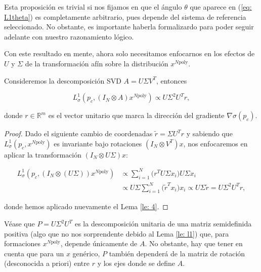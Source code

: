 \newpage

Esta proposición es trivial si nos fijamos en que el ángulo $\theta$ que aparece en (\ref{eq: L1theta}) es completamente arbitrario, pues depende del sistema de referencia seleccionado. No obstante, es importante haberla formalizardo para poder seguir adelante con nuestro razonamiento lógico.

Con este resultado en mente, ahora solo necesitamos enfocarnos en los efectos de $U$ y $\Sigma$ de la transformación afín sobre la distribución $x^{N\text{poly}}$.

\vspace{0.2cm}

\begin{prop} \label{pro: usu}
Consideremos la descomposición SVD $A = U\Sigma V^T$, entonces

\begin{equation}
L^1_\sigma(p_c,(I_N \otimes A) x^{N\text{poly}}) \propto U\Sigma^2U^Tr, \nonumber
\end{equation}

donde $r\in\mathbb{R}^m$ es el vector unitario que marca la dirección del gradiente $\nabla\sigma(p_c)$.
\end{prop}
\begin{proof}
Dado el siguiente cambio de coordenadas $\tilde r = \Sigma U^Tr$ y sabiendo que $L^1_\sigma(p_c, x^{N\text{poly}})$ es invariante bajo rotaciones $(I_N\otimes V^T)x$, nos enfocaremos en aplicar la transformación $(I_N \otimes U\Sigma) x$:

\begin{align}
L^1_\sigma(p_c,(I_N \otimes (U\Sigma)) x^{N\text{poly}}) &\propto \sum_{i=1}^N \Big(r^T U\Sigma x_i\Big)U\Sigma x_i \nonumber \\
&\propto U\Sigma\sum_{i=1}^N \Big(\tilde r^T x_i\Big) x_i \propto U\Sigma \tilde r \nonumber = U\Sigma^2U^Tr,
\end{align}

donde hemos aplicado nuevamente el Lema \ref{le: 4}.
\end{proof}

\begin{rem} \label{rem: usu}
Véase que $P = U\Sigma^2U^T$ es la descomposición unitaria de una matriz semidefinida positiva (algo que no nos sorprendente debido al Lema \ref{le: l1}) que, para formaciones $x^{N\text{poly}}$, depende únicamente de $A$. No obstante, hay que tener en cuenta que para un $x$ genérico, $P$ también dependerá de la matriz de rotación (desconocida a priori) entre $r$ y los ejes donde se define $A$.

\end{rem}

